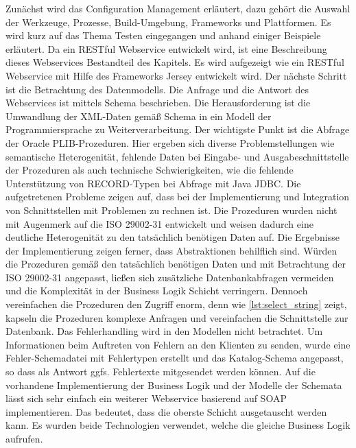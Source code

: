 Zunächst wird das Configuration Management erläutert, dazu gehört die Auswahl der Werkzeuge, Prozesse, Build-Umgebung, Frameworks und Plattformen. Es wird kurz auf das Thema Testen eingegangen und anhand einiger Beispiele erläutert. Da ein \gls{REST}ful \gls{Webservice} entwickelt wird, ist eine Beschreibung dieses Webservices Bestandteil des Kapitels. Es wird aufgezeigt wie ein  \gls{REST}ful \gls{Webservice} mit Hilfe des Frameworks Jersey entwickelt wird. 
Der nächste Schritt ist die Betrachtung des Datenmodells. Die Anfrage und die Antwort des  \glspl{Webservice} ist mittels Schema beschrieben. Die Herausforderung ist die Umwandlung der XML-Daten gemäß Schema in ein Modell der Programmiersprache zu Weiterverarbeitung.  
Der wichtigste Punkt ist die Abfrage der \gls{Oracle} \gls{PLIB}-Prozeduren. Hier ergeben sich diverse Problemstellungen wie semantische Heterogenität, fehlende Daten bei Eingabe- und Ausgabeschnittstelle der Prozeduren als auch technische Schwierigkeiten, wie die fehlende Unterstützung von RECORD-Typen bei Abfrage mit Java JDBC.
Die aufgetretenen Probleme zeigen auf, dass bei der Implementierung und Integration von Schnittstellen mit Problemen zu rechnen ist. Die Prozeduren wurden nicht mit Augenmerk auf die ISO 29002-31 entwickelt und weisen dadurch eine deutliche Heterogenität zu den tatsächlich benötigen Daten auf. Die Ergebnisse der Implementierung zeigen ferner, dass Abstraktionen behilflich sind. Würden die Prozeduren gemäß den tatsächlich benötigen Daten und mit Betrachtung der ISO 29002-31 angepasst, ließen sich zusätzliche Datenbankabfragen vermeiden und die Komplexität in der Business Logik Schicht verringern. Dennoch vereinfachen die Prozeduren den Zugriff enorm, denn wie \autoref{lst:select_string} zeigt, kapseln die Prozeduren komplexe Anfragen und vereinfachen die Schnittstelle zur Datenbank. 
Das Fehlerhandling wird in den Modellen nicht betrachtet. Um Informationen beim Auftreten von Fehlern an den Klienten zu senden, wurde eine Fehler-Schemadatei mit Fehlertypen erstellt und das Katalog-Schema angepasst, so dass als Antwort ggfs. Fehlertexte mitgesendet werden können. 
Auf die vorhandene Implementierung der Business Logik und der Modelle der Schemata lässt sich sehr einfach ein weiterer \gls{Webservice} basierend auf SOAP implementieren. Das bedeutet, dass die oberste Schicht ausgetauscht werden kann. Es wurden beide Technologien verwendet, welche die gleiche Business Logik aufrufen. 

